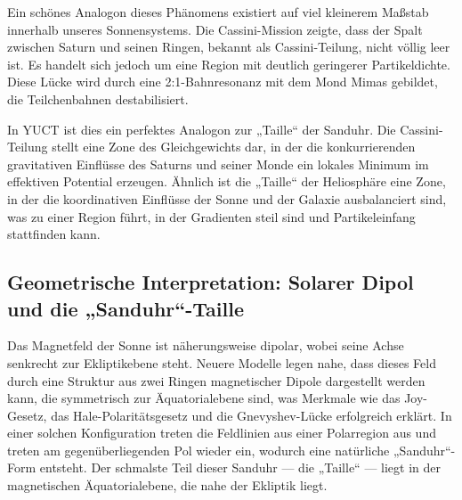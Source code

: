 \documentclass[12pt,a4paper]{article}
\theoremstyle{remark}
\begin{document}
	Ein schönes Analogon dieses Phänomens existiert auf viel kleinerem Maßstab innerhalb unseres Sonnensystems. Die Cassini-Mission zeigte, dass der Spalt zwischen Saturn und seinen Ringen, bekannt als Cassini-Teilung, nicht völlig leer ist. Es handelt sich jedoch um eine Region mit deutlich geringerer Partikeldichte. Diese Lücke wird durch eine 2:1-Bahnresonanz mit dem Mond Mimas gebildet, die Teilchenbahnen destabilisiert.
	
	In YUCT ist dies ein perfektes Analogon zur „Taille“ der Sanduhr. Die Cassini-Teilung stellt eine Zone des Gleichgewichts dar, in der die konkurrierenden gravitativen Einflüsse des Saturns und seiner Monde ein lokales Minimum im effektiven Potential erzeugen. Ähnlich ist die „Taille“ der Heliosphäre eine Zone, in der die koordinativen Einflüsse der Sonne und der Galaxie ausbalanciert sind, was zu einer Region führt, in der Gradienten steil sind und Partikeleinfang stattfinden kann.
	
	\subsection{Geometrische Interpretation: Solarer Dipol und die „Sanduhr“-Taille}
	\label{subsec:coord:dipole_geometry}
	
	Das Magnetfeld der Sonne ist näherungsweise dipolar, wobei seine Achse senkrecht zur Ekliptikebene steht. Neuere Modelle legen nahe, dass dieses Feld durch eine Struktur aus zwei Ringen magnetischer Dipole dargestellt werden kann, die symmetrisch zur Äquatorialebene sind, was Merkmale wie das Joy-Gesetz, das Hale-Polaritätsgesetz und die Gnevyshev-Lücke erfolgreich erklärt. In einer solchen Konfiguration treten die Feldlinien aus einer Polarregion aus und treten am gegenüberliegenden Pol wieder ein, wodurch eine natürliche „Sanduhr“-Form entsteht. Der schmalste Teil dieser Sanduhr — die „Taille“ — liegt in der magnetischen Äquatorialebene, die nahe der Ekliptik liegt.
	
\end{document}
